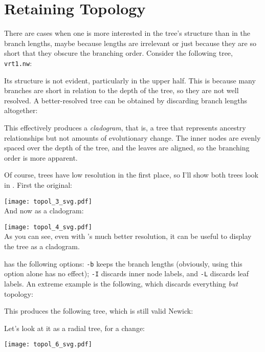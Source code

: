 \section{Retaining Topology}
\label{sct_topology}

There are cases when one is more interested in the tree's structure than in the
branch lengths, maybe because lengths are irrelevant or just because they are
so short that they obscure the branching order. Consider the following tree,
\texttt{vrt1.nw}:
\begin{samepage}

\end{samepage}
Its structure is not evident, particularly in the upper half. This is because
many branches are short in relation to the depth of the tree, so they are not
well resolved. A better-resolved tree can be obtained by discarding branch
lengths altogether:

\begin{samepage}

\end{samepage}
This effectively produces a \emph{cladogram}, that is, a tree that represents
ancestry relationships but not amounts of evolutionary change. The inner nodes
are evenly spaced over the depth of the tree, and the leaves are aligned, so
the branching order is more apparent.

Of course, \ascii{} trees have low resolution in the first place, so I'll show
both trees look in \svg. First the original: 

\texttt{[image: topol\_3\_svg.pdf]} \\

\noindent{}And now as a cladogram:

\texttt{[image: topol\_4\_svg.pdf]} \\
As you can see, even with \svg{}'s much better resolution, it can be useful to
display the tree as a cladogram.

\topology{} has the following options: \texttt{-b} keeps the branch lengths (obviously, using this option alone has no effect); \texttt{-I} discards inner node labels, and \texttt{-L} discards leaf labels. An extreme example is the following, which discards everything \emph{but} topology:

This produces the following tree, which is still valid Newick:

Let's look at it as a radial tree, for a change:

\begin{center}
\texttt{[image: topol\_6\_svg.pdf]}
\end{center}

